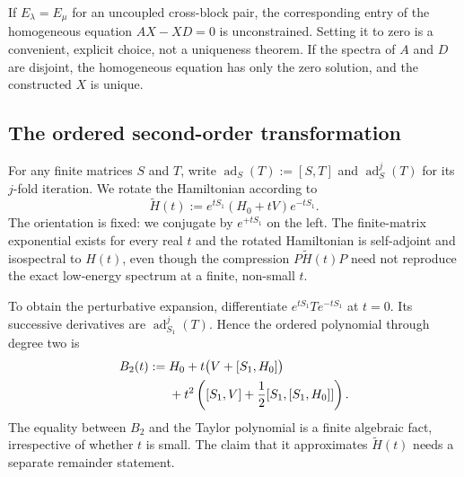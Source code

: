 \begin{remark}
If $E_\lambda=E_\mu$ for an uncoupled cross-block pair, the
corresponding entry of the homogeneous equation
$AX-XD=0$ is unconstrained.  Setting it to zero is a convenient,
explicit choice, not a uniqueness theorem.  If the spectra of $A$ and
$D$ are disjoint, the homogeneous equation has only the zero solution,
and the constructed $X$ is unique.
\end{remark}

\subsection{The ordered second-order transformation}
\label{subsec:ch21-sw-bch}

For any finite matrices $S$ and $T$, write
$\operatorname{ad}_S(T):=[S,T]$ and
$\operatorname{ad}_S^j(T)$ for its $j$-fold iteration.  We rotate the
Hamiltonian according to
\begin{equation}
 \widetilde H(t):=e^{tS_1}(H_0+tV)e^{-tS_1}.
\label{eq:ch21-sw-rotated}
\end{equation}
The orientation is fixed: we conjugate by $e^{+tS_1}$ on the left.
The finite-matrix exponential exists for every real $t$ and the
rotated Hamiltonian is self-adjoint and isospectral to $H(t)$, even
though the compression $P\widetilde H(t)P$ need not reproduce the exact
low-energy spectrum at a finite, non-small $t$.

To obtain the perturbative expansion, differentiate
$e^{tS_1}Te^{-tS_1}$ at $t=0$.  Its successive derivatives are
$\operatorname{ad}_{S_1}^j(T)$.  Hence the ordered polynomial through
degree two is
\begin{align}
B_2(t):={}&H_0+t\bigl(V+[S_1,H_0]\bigr)\notag\\
 &+t^2\left([S_1,V]
        +\frac12[S_1,[S_1,H_0]]\right).
\label{eq:ch21-bch-two-polynomial}
\end{align}
The equality between $B_2$ and the Taylor polynomial is a finite
algebraic fact, irrespective of whether $t$ is small.  The claim that
it approximates $\widetilde H(t)$ needs a separate remainder statement.

